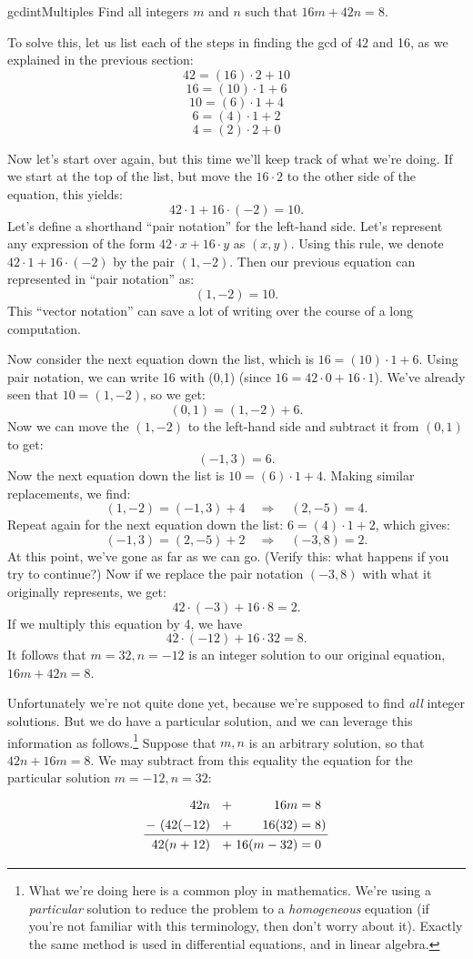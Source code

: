 \begin{example}{gcdintMultiples}
Find all integers $m$ and $n$ such that $16 m + 42 n = 8$.

To solve this, let us list each of the steps in finding the gcd of 42 and 16, as we explained in the previous section:
\[ 42 = (16)\cdot 2 + 10\]
\[ 16 = (10)\cdot 1 + 6\]
\[ 10 = (6)\cdot 1 + 4\]
\[ 6 = (4)\cdot 1 + 2\]
\[ 4 = (2)\cdot 2 + 0\]

Now let's start over again, but this time we'll keep track of what we're doing. If we start at the top of the list, but move the $16\cdot2$ to the other side of the equation, this yields:
\[ 42 \cdot 1 + 16 \cdot (-2) = 10.\]
Let's define a shorthand ``pair notation'' for the left-hand side. Let's represent any expression of the form $42\cdot x + 16 \cdot y$ as $(x,y)$. Using this rule, we denote $42 \cdot 1 + 16 \cdot (-2)$ by the pair $(1,-2)$.  Then our previous equation can represented  in ``pair notation'' as:
\[ (1,-2) = 10.\]
This ``vector notation'' can save a lot of writing over the course of a long computation.

Now consider the next equation down the list, which is 
$ 16 = (10)\cdot 1 + 6 $.
Using pair notation, we can write 16 with (0,1)  (since $16 = 42 \cdot 0 + 16 \cdot 1$). We've already seen that $10 = (1,-2)$, so we get:
\[(0,1) = (1,-2) + 6.\]
Now we can move the $(1,-2)$ to the left-hand side and subtract it from $(0,1)$ to get:
\[ (-1,3) = 6. \]
Now the next equation down the list is $10 = (6)\cdot 1 + 4$. 
Making similar replacements, we find:
\[(1,-2) = (-1,3) + 4\quad\Rightarrow\quad (2,-5) = 4.\]
Repeat again for the next equation down the list:
$ 6 = (4)\cdot 1 + 2$, which gives:
\[ (-1,3) = (2,-5) + 2 \quad\Rightarrow\quad (-3,8) = 2.\]  
At this point, we've gone as far as we can go.  (Verify this: what happens if you try to continue?) Now if we replace the pair notation $(-3,8)$ with what it originally represents, we get:
\[42\cdot ( -3) + 16 \cdot 8 = 2.\]
If we multiply this equation by 4, we have
\[42 \cdot( -12) + 16 \cdot 32 = 8.\]
It follows that $m=32, n=-12$ is an integer solution to our original equation, $16m + 42n = 8$.

Unfortunately we're not quite done yet, because we're supposed to find \emph{all} integer solutions. But we do have a particular solution, and we can leverage this information as follows.\footnote{What we're doing here  is a common ploy in mathematics.  We're using a \emph{particular} solution to reduce the problem to a \emph{homogeneous} equation (if you're not familiar with this terminology, then don't worry about it).  Exactly the same method is used in differential equations, and in linear algebra.}
   Suppose that $m,n$ is an arbitrary solution, so that  $42n + 16m = 8$.  We may subtract from this  equality the equation for the particular solution $m=-12, n=32$: 
\[\arraycolsep=1.4pt\def\arraystretch{1.3}
\begin{array}{rcrcl } 
    42n &~~+& 16m  &=& 8  \\
 -~ (42(-12) &~~+& 16(32)  &=&  8)   \\
    \cline{1-5} 
    42(n+12) &~~+& 16(m-32) &=& 0   
\end{array}
\]


\end{example}
